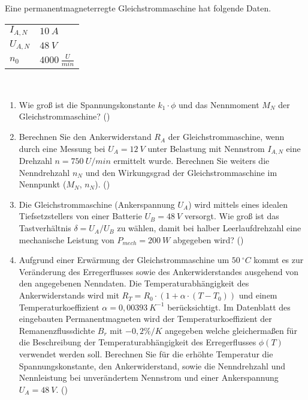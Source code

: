 \begin{question}[topic=gsm,type=exam,tags={20140514}]
Eine permanentmagneterregte Gleichstrommaschine hat folgende Daten.\\
\begin{tabular}{L{2cm}l}
$I_{A,N}$ \dotfill &$10~A$\\
$U_{A,N}$ \dotfill & $48~V$ \\
$n_0$ \dotfill & $4000~\frac{U}{min}$
\end{tabular}\\
\begin{enumerate}
\item Wie groß ist die Spannungskonstante $k_1 \cdot \phi$ und das Nennmoment $M_N$ der Gleichstrommaschine? ()
\item Berechnen Sie den Ankerwiderstand $R_A$ der Gleichstrommaschine, wenn durch eine Messung bei $U_A = 12~V$ unter Belastung mit Nennstrom $I_{A,N}$ eine Drehzahl $n= 750~ U/min$ ermittelt wurde. Berechnen Sie weiters die Nenndrehzahl $n_N$ und den Wirkungsgrad der Gleichstrommaschine im Nennpunkt ($M_N$, $n_N$). ()
\item Die Gleichstrommaschine (Ankerspannung $U_A$) wird mittels eines idealen Tiefsetzstellers von einer Batterie $U_B = 48~V$ versorgt. Wie groß ist das Tastverhältnis $\delta = U_A / U_B$ zu wählen, damit bei halber Leerlaufdrehzahl eine mechanische Leistung von $P_{mech} = 200~W$ abgegeben wird? ()
\item Aufgrund einer Erwärmung der Gleichstrommaschine um $50~ ^\circ C$ kommt es zur Veränderung des Erregerflusses sowie des Ankerwiderstandes ausgehend von den angegebenen Nenndaten. Die Temperaturabhängigkeit des Ankerwiderstands wird mit $R_T = R_0 \cdot ( 1 + \alpha \cdot(T - T_0))$ und einem Temperaturkoeffizient $\alpha = 0,00393~ K^{-1}$ berücksichtigt. Im Datenblatt des eingebauten Permanentmagneten wird der Temperaturkoeffizient der Remanenzflussdichte $B_r$ mit $-0,2\%/K$ angegeben welche gleichermaßen für die Beschreibung der Temperaturabhängigkeit des Erregerflusses $\phi(T)$ verwendet werden soll. Berechnen Sie für die erhöhte Temperatur die Spannungskonstante, den Ankerwiderstand, sowie die Nenndrehzahl und Nennleistung bei unverändertem Nennstrom und einer Ankerspannung $U_A = 48~V$. ()
\end{enumerate}
\end{question}
